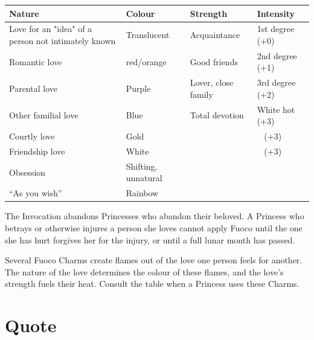 \begin{multicols}{2}
    \centering \begin{tabulary}{1\textwidth}{|L|L|L|L|}
        \hline
        Nature                                               & Colour                & Strength             & Intensity        \\ \hline
        Love for an "idea" of a person not intimately known  & Translucent          & Acquaintance         & 1st degree (+0)  \\ \hline
        Romantic love                                        & red/orange           & Good friends         & 2nd degree (+1)  \\ \hline
        Parental love                                        & Purple                 & Lover, close family  & 3rd degree (+2)  \\ \hline
        Other familial love                                  & Blue                & Total devotion       & White hot (+3)   \\ \hline
		Courtly love                                         & Gold                & ~                    & ~ (+3)   \\ \hline
		Friendship love                                      & White                & ~                    & ~ (+3)   \\ \hline
        Obsession                                            & Shifting, unnatural  & ~                    & ~                \\ \hline
        \textquotedblleft As you wish\textquotedblright\,      & Rainbow              & ~                    & ~                \\
        \hline
    \end{tabulary}
	\bigsidebarend

The Invocation abandons Princesses who abandon their beloved. A Princess who betrays or otherwise injures a person she loves cannot apply Fuoco until the one she has hurt forgives her for the injury, or until a full lunar month has passed.

Several Fuoco Charms create flames out of the love one person feels for another. The nature of the love determines the colour of these flames, and the love's strength fuels their heat. Consult the table when a Princess uses these Charms. 

\section*{Quote}


\end{multicols}
